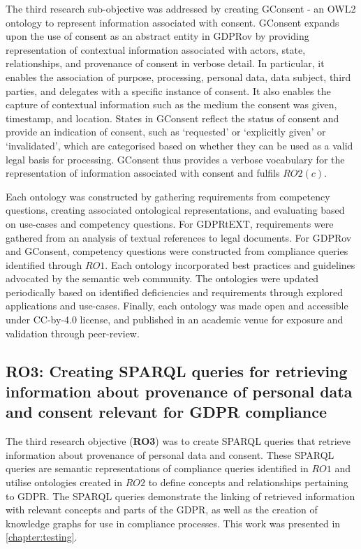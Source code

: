 The third research sub-objective was addressed by creating GConsent - an OWL2 ontology to represent information associated with consent. GConsent expands upon the use of consent as an abstract entity in GDPRov by providing representation of contextual information associated with actors, state, relationships, and provenance of consent in verbose detail. In particular, it enables the association of purpose, processing, personal data, data subject, third parties, and delegates with a specific instance of consent. It also enables the capture of contextual information such as the medium the consent was given, timestamp,  and location. States in GConsent reflect the status of consent and provide an indication of consent, such as `requested' or `explicitly given' or `invalidated', which are categorised based on whether they can be used as a valid legal basis for processing. GConsent thus provides a verbose vocabulary for the representation of information associated with consent and fulfils $RO2(c)$.

Each ontology was constructed by gathering requirements from competency questions, creating associated ontological representations, and evaluating based on use-cases and competency questions. For GDPRtEXT, requirements were gathered from an analysis of textual references to legal documents. For GDPRov and GConsent, competency questions were constructed from compliance queries identified through $RO1$. Each ontology incorporated best practices and guidelines advocated by the semantic web community. The ontologies were updated periodically based on identified deficiencies and requirements through explored applications and use-cases. Finally, each ontology was made open and accessible under CC-by-4.0 license, and published in an academic venue for exposure and validation through peer-review.

\subsection*{RO3: Creating SPARQL queries for retrieving information about provenance of personal data and consent relevant for GDPR compliance}
The third research objective (\textbf{RO3}) was to create SPARQL queries that retrieve information about provenance of personal data and consent. These SPARQL queries are semantic representations of compliance queries identified in $RO1$ and utilise ontologies created in $RO2$ to define concepts and relationships pertaining to GDPR. The SPARQL queries demonstrate the linking of retrieved information with relevant concepts and parts of the GDPR, as well as the creation of knowledge graphs for use in compliance processes. This work was presented in \autoref{chapter:testing}.

